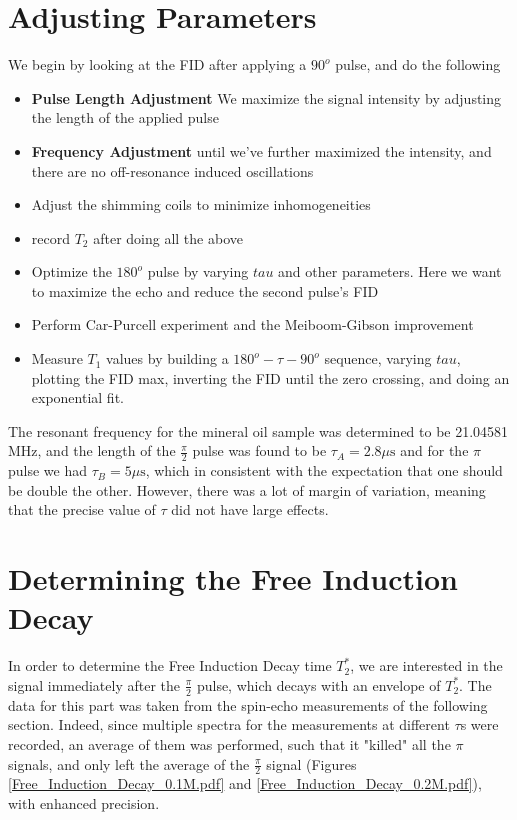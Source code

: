 \documentclass[12pt]{article}
\begin{document}
\section{Adjusting Parameters}

We begin by looking at the FID after applying a $90^o$ pulse, and do the following

\begin{itemize}
    \item \textbf{Pulse Length Adjustment} We maximize the signal intensity by adjusting the length of the applied pulse
    \item \textbf{Frequency Adjustment} until we've further maximized the intensity, and there are no off-resonance induced oscillations
    \item Adjust the shimming coils to minimize inhomogeneities
    \item record $T_2$ after doing all the above
    \item Optimize the $180^o$ pulse by varying $tau$ and other parameters. Here we want to maximize the echo and reduce the second pulse's FID
    \item Perform Car-Purcell experiment and the Meiboom-Gibson improvement
    \item Measure $T_1$ values by building a $180^o - \tau - 90^o$ sequence, varying $tau$, plotting the FID max, inverting the FID until the zero crossing, and doing an exponential fit.

\end{itemize}

The resonant frequency for the mineral oil sample was determined to be 21.04581 MHz, and the length of the $\frac{\pi}{2}$ pulse was found to be $\tau_{A} = 2.8 \text{$\mu$s}$ and for the $\pi$ pulse we had $\tau_{B} = 5 \text{$\mu$s}$, which in consistent with the expectation that one should be double the other. However, there was a lot of margin of variation, meaning that the precise value of $\tau$ did not have large effects.

\section{Determining the Free Induction Decay}
In order to determine the Free Induction Decay time $T_2^*$, we are interested in the signal immediately after the $\frac{\pi}{2}$ pulse, which decays with an envelope of $T_2^*$. The data for this part was taken from the spin-echo measurements of the following section. Indeed, since multiple spectra for the measurements at different $\tau$s were recorded, an average of them was performed, such that it "killed" all the $\pi$ signals, and only left the average of the $\frac{\pi}{2}$ signal (Figures \ref{Free_Induction_Decay_0.1M.pdf} and \ref{Free_Induction_Decay_0.2M.pdf}), with enhanced precision.
\end{document}
